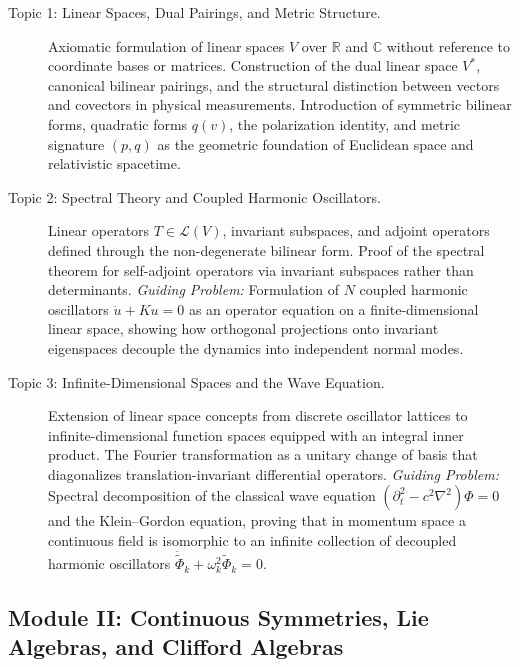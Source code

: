 \documentclass[11pt,a4paper]{article}
\newcommand{\R}{\mathbb{R}}
\newcommand{\C}{\mathbb{C}}
\begin{document}
\begin{description}
  \item[Topic 1: Linear Spaces, Dual Pairings, and Metric Structure.]
    Axiomatic formulation of linear spaces $V$ over $\R$ and $\C$ without
    reference to coordinate bases or matrices. Construction of the dual linear
    space $V^{*}$, canonical bilinear pairings, and the structural distinction
    between vectors and covectors in physical measurements. Introduction of
    symmetric bilinear forms, quadratic forms $q(v)$, the polarization
    identity, and metric signature $(p,q)$ as the geometric foundation of
    Euclidean space and relativistic spacetime.

  \item[Topic 2: Spectral Theory and Coupled Harmonic Oscillators.]
    Linear operators $T \in \mathcal{L}(V)$, invariant subspaces, and adjoint
    operators defined through the non-degenerate bilinear form. Proof of the
    spectral theorem for self-adjoint operators via invariant subspaces rather
    than determinants.
    \emph{Guiding Problem:} Formulation of $N$ coupled harmonic oscillators
    $\ddot{u} + Ku = 0$ as an operator equation on a finite-dimensional linear
    space, showing how orthogonal projections onto invariant eigenspaces
    decouple the dynamics into independent normal modes.

  \item[Topic 3: Infinite-Dimensional Spaces and the Wave Equation.]
    Extension of linear space concepts from discrete oscillator lattices to
    infinite-dimensional function spaces equipped with an integral inner
    product. The Fourier transformation as a unitary change of basis that
    diagonalizes translation-invariant differential operators.
    \emph{Guiding Problem:} Spectral decomposition of the classical wave
    equation $(\partial_{t}^{2} - c^{2}\nabla^{2})\Phi = 0$ and the
    Klein--Gordon equation, proving that in momentum space a continuous field
    is isomorphic to an infinite collection of decoupled harmonic oscillators
    $\ddot{\tilde{\Phi}}_{k} + \omega_{k}^{2}\tilde{\Phi}_{k} = 0$.
\end{description}

\subsection{Module II: Continuous Symmetries, Lie Algebras, and Clifford
  Algebras}
\label{subsec:mod2}
\end{document}
